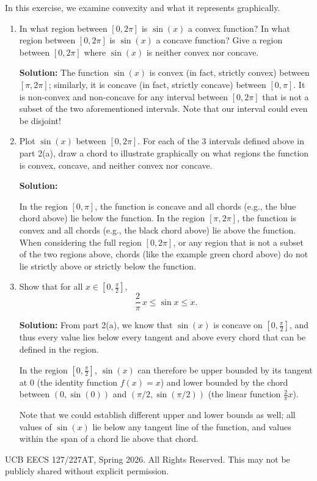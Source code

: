 \documentclass[10pt]{article}
\begin{document}
In this exercise, we examine convexity and what it represents graphically.

\begin{enumerate}[label=(\alph*)]
    \item In what region between $[0, 2\pi]$ is $\sin(x)$ a convex function? In what region between $[0, 2\pi]$ is $\sin(x)$ a concave function? Give a region between $[0, 2\pi]$ where $\sin(x)$ is neither convex nor concave.

    \textbf{Solution:} The function $\sin(x)$ is convex (in fact, strictly convex) between $[\pi, 2\pi]$; similarly, it is concave (in fact, strictly concave) between $[0, \pi]$. It is non-convex and non-concave for any interval between $[0, 2\pi]$ that is not a subset of the two aforementioned intervals. Note that our interval could even be disjoint!

    \item Plot $\sin(x)$ between $[0, 2\pi]$. For each of the 3 intervals defined above in part 2(a), draw a chord to illustrate graphically on what regions the function is convex, concave, and neither convex nor concave.

    \textbf{Solution:}

    In the region $[0, \pi]$, the function is concave and all chords (e.g., the blue chord above) lie below the function. In the region $[\pi, 2\pi]$, the function is convex and all chords (e.g., the black chord above) lie above the function. When considering the full region $[0, 2\pi]$, or any region that is not a subset of the two regions above, chords (like the example green chord above) do not lie strictly above or strictly below the function.

    \item Show that for all $x \in [0, \frac{\pi}{2}]$,
    \begin{equation}
        \frac{2}{\pi}\, x \leq \sin x \leq x.
    \end{equation}

    \textbf{Solution:} From part 2(a), we know that $\sin(x)$ is concave on $[0, \frac{\pi}{2}]$, and thus every value lies below every tangent and above every chord that can be defined in the region.

    In the region $[0, \frac{\pi}{2}]$, $\sin(x)$ can therefore be upper bounded by its tangent at $0$ (the identity function $f(x) = x$) and lower bounded by the chord between $(0, \sin(0))$ and $(\pi/2, \sin(\pi/2))$ (the linear function $\frac{2}{\pi}x$).

    Note that we could establish different upper and lower bounds as well; all values of $\sin(x)$ lie below any tangent line of the function, and values within the span of a chord lie above that chord.
\end{enumerate}

\vfill
\noindent\small\textcopyright{} UCB EECS 127/227AT, Spring 2026. All Rights Reserved. This may not be publicly shared without explicit permission.
\end{document}
